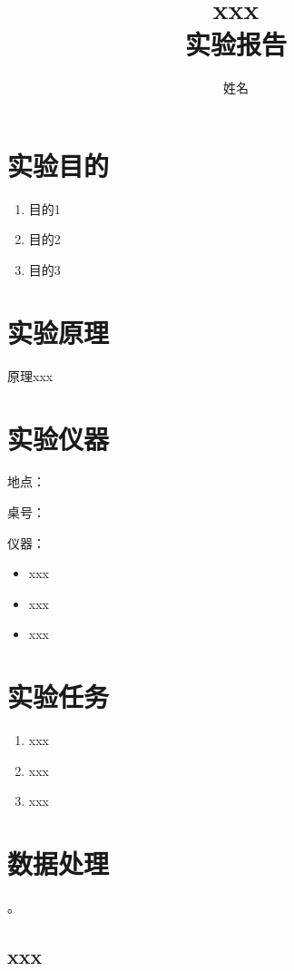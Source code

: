 \documentclass[10pt, a4paper]{article}
\begin{document}
\title{xxx\\实验报告}
\author{姓名}

\maketitle

\tableofcontents

\section{实验目的}

\begin{enumerate}
    \item 目的1
    \item 目的2
    \item 目的3
\end{enumerate}

\section{实验原理}

原理xxx

\section{实验仪器}

地点：

桌号：

仪器：
\begin{itemize}
    \item xxx
    \item xxx
    \item xxx
\end{itemize}

\section{实验任务}

\begin{enumerate}
    \item xxx
    \item xxx
    \item xxx
\end{enumerate}

\section{数据处理}。

\subsection{xxx}
\end{document}
